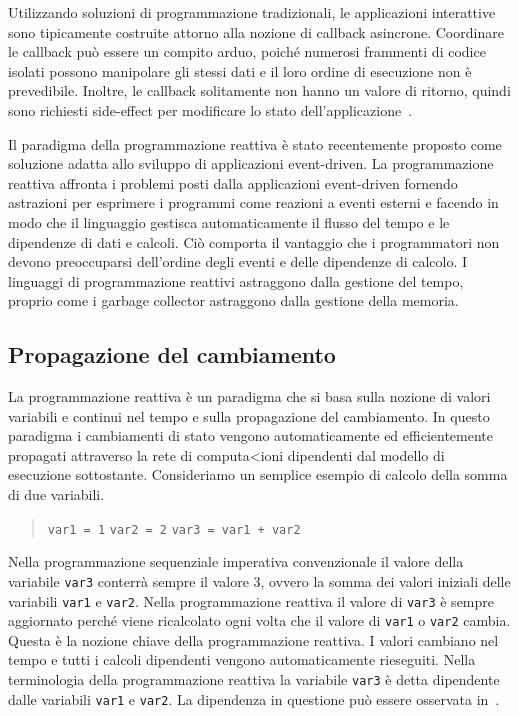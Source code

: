 \documentclass[12pt,a4paper,openright,twoside]{book}
\begin{document}
Utilizzando soluzioni di programmazione tradizionali, le applicazioni interattive sono tipicamente costruite attorno alla nozione di callback asincrone. 
Coordinare le callback può essere un compito arduo, poiché numerosi frammenti di codice isolati possono manipolare gli stessi dati e il loro ordine di esecuzione non è prevedibile. Inoltre, le callback solitamente non hanno un valore di ritorno, quindi sono richiesti side-effect per modificare lo stato dell'applicazione~\cite{DBLP:phd/us/Cooper08}. 

Il paradigma della programmazione reattiva è stato recentemente proposto come soluzione adatta allo sviluppo di applicazioni event-driven. La programmazione reattiva affronta i problemi posti dalla applicazioni event-driven fornendo astrazioni per esprimere i programmi come reazioni a eventi esterni e facendo in modo che il linguaggio gestisca automaticamente il flusso del tempo e le dipendenze di dati e calcoli. Ciò comporta il vantaggio che i programmatori non devono preoccuparsi dell'ordine degli eventi e delle dipendenze di calcolo. I linguaggi di programmazione reattivi astraggono dalla gestione del tempo, proprio come i garbage collector astraggono dalla gestione della memoria. 

\subsection{Propagazione del cambiamento}
La programmazione reattiva è un paradigma che si basa sulla nozione di valori variabili e continui nel tempo e sulla propagazione del cambiamento. 
In questo paradigma i cambiamenti di stato vengono automaticamente ed efficientemente propagati attraverso la rete di computa<ioni dipendenti dal modello di esecuzione sottostante. Consideriamo un semplice esempio di calcolo della somma di due variabili.
\begin{quotation}
    \texttt{var1 = 1}
    \texttt{var2 = 2}
    \texttt{var3 = var1 + var2}
\end{quotation}

Nella programmazione sequenziale imperativa convenzionale il valore della variabile \texttt{var3} conterrà sempre il valore 3, ovvero la somma dei valori iniziali delle variabili \texttt{var1} e \texttt{var2}.
Nella programmazione reattiva il valore di \texttt{var3} è sempre aggiornato perché viene ricalcolato ogni volta che il valore di \texttt{var1} o \texttt{var2} cambia.
Questa è la nozione chiave della programmazione reattiva. I valori cambiano nel tempo e tutti i calcoli dipendenti vengono automaticamente rieseguiti. Nella terminologia della programmazione reattiva la variabile \texttt{var3} è detta dipendente dalle variabili \texttt{var1} e \texttt{var2}. La dipendenza in questione può essere osservata in~.
\end{document}
